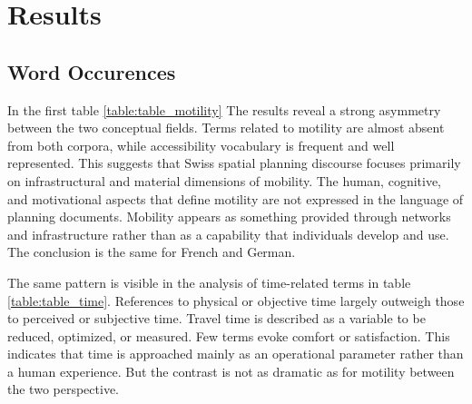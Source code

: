 \section{Results}

\subsection{Word Occurences}

In the first table \ref{table:table_motility} The results reveal a strong asymmetry between the two conceptual fields. Terms related to motility are almost absent from both corpora, while accessibility vocabulary is frequent and well represented. This suggests that Swiss spatial planning discourse focuses primarily on infrastructural and material dimensions of mobility. The human, cognitive, and motivational aspects that define motility are not expressed in the language of planning documents. Mobility appears as something provided through networks and infrastructure rather than as a capability that individuals develop and use. The conclusion is the same for French and German.

The same pattern is visible in the analysis of time-related terms in table \ref{table:table_time}. References to physical or objective time largely outweigh those to perceived or subjective time. Travel time is described as a variable to be reduced, optimized, or measured. Few terms evoke comfort or satisfaction. This indicates that time is approached mainly as an operational parameter rather than a human experience. But the contrast is not as dramatic as for motility between the two perspective.

